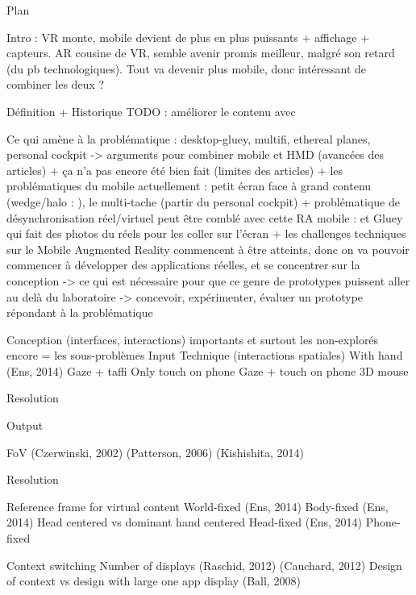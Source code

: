Plan

Intro : VR monte, mobile devient de plus en plus puissants + affichage + capteurs. AR cousine de VR, semble avenir promis meilleur, malgré son retard (du pb technologiques). Tout va devenir plus mobile, donc intéressant de combiner les deux ?
\cite{DeSaChurchill2013}

Définition + Historique
TODO : améliorer le contenu avec \cite{Chalon2004}

Ce qui amène à la problématique : desktop-gluey, multifi, ethereal planes, personal cockpit -> arguments pour combiner mobile et HMD (avancées des articles) + ça n'a pas encore été bien fait (limites des articles)
+ les problématiques du mobile actuellement : petit écran face à grand contenu (wedge/halo : \cite{BaudischRosenholtz2003} \cite{GustafsonBaudischGutwinEtAl2008} \cite{BurigatChittaro2011}), le multi-tache (partir du personal cockpit)
+ problématique de désynchronisation réel/virtuel peut être comblé avec cette RA mobile : \cite{Chalon2004} et Gluey qui fait des photos du réels pour les coller sur l'écran
+ les challenges techniques sur le Mobile Augmented Reality commencent à être atteints, donc on va pouvoir commencer à développer des applications réelles, et se concentrer sur la conception -> ce qui est nécessaire pour que ce genre de prototypes puissent aller au delà du laboratoire
-> concevoir, expérimenter, évaluer un prototype répondant à la problématique

Conception (interfaces, interactions) importants et surtout les non-explorés encore = les sous-problèmes
    Input 
        Technique (interactions spatiales)
            With hand (Ens, 2014) 
            Gaze + taffi 
            Only touch on phone 
            Gaze + touch on phone 
            3D mouse 

        Resolution 

    Output 

        FoV (Czerwinski, 2002) (Patterson, 2006) (Kishishita, 2014) 

        Resolution 

        Reference frame for virtual content 
            World-fixed (Ens, 2014) 
            Body-fixed (Ens, 2014) 
                Head centered vs dominant hand centered 
            Head-fixed (Ens, 2014) 
            Phone-fixed 

        Context switching 
            Number of displays (Raschid, 2012) (Cauchard, 2012) 
            Design of context vs design with large one app display (Ball, 2008) 

